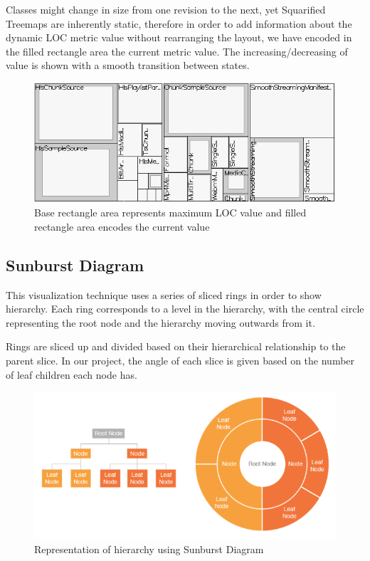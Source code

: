 Classes might change in size from one revision to the next, yet Squarified Treemaps are inherently static, therefore in order to add information about the dynamic LOC metric value without rearranging the layout, we have encoded in the filled rectangle area the current metric value. The increasing/decreasing of value is shown with a smooth transition between states.

\begin{figure}[H]
  \centering
  \includegraphics[width=1\textwidth]{figures/dynamic_treemap.png}
  \caption{Base rectangle area represents maximum LOC value and filled rectangle area encodes the current value}
  \label{fig:dynamic_treemap}
\end{figure}

\subsection{Sunburst Diagram}
This visualization technique uses a series of sliced rings in order to show hierarchy. Each ring corresponds to a level in the hierarchy, with the central circle representing the root node and the hierarchy moving outwards from it.

Rings are sliced up and divided based on their hierarchical relationship to the parent slice. In our project, the angle of each slice is given based on the number of leaf children each node has.

\begin{figure}[H]
  \centering
  \includegraphics[width=1\textwidth]{figures/sunburst_catalog.png}
  \caption{Representation of hierarchy using Sunburst Diagram}
  \label{fig:sunburst_catalog}
\end{figure}

